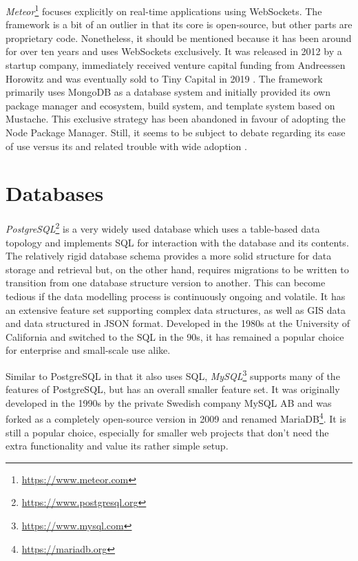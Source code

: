 \emph{Meteor}\footnote{\url{https://www.meteor.com}} focuses explicitly on real-time applications using WebSockets. The framework is a bit of an outlier in that its core is open-source, but other parts are proprietary code. Nonetheless, it should be mentioned because it has been around for over ten years and uses WebSockets exclusively. It was released in 2012 by a startup company, immediately received venture capital funding from Andreessen Horowitz and was eventually sold to Tiny Capital in 2019 \parencite{meteorSaleTinyCapital}. The framework primarily uses MongoDB as a database system and initially provided its own package manager and ecosystem, build system, and template system based on Mustache. This exclusive strategy has been abandoned in favour of adopting the Node Package Manager. Still, it seems to be subject to debate regarding its ease of use versus its  and related trouble with wide adoption \parencite{meteorDiscussionYCombinator}.


\section{Databases}





\emph{PostgreSQL}\footnote{\url{https://www.postgresql.org}} is a very widely used database which uses a table-based data topology and implements \ac{SQL} for interaction with the database and its contents. The relatively rigid database schema provides a more solid structure for data storage and retrieval but, on the other hand, requires migrations to be written to transition from one database structure version to another. This can become tedious if the data modelling process is continuously ongoing and volatile. It has an extensive feature set supporting complex data structures, as well as \ac{GIS} data and data structured in \ac{JSON} format. Developed in the 1980s at the University of California and switched to the \ac{SQL} in the 90s, it has remained a popular choice for enterprise and small-scale use alike.

Similar to PostgreSQL in that it also uses \ac{SQL}, \emph{MySQL}\footnote{\url{https://www.mysql.com}} supports many of the features of PostgreSQL, but has an overall smaller feature set. It was originally developed in the 1990s by the private Swedish company MySQL AB and was forked as a completely open-source version in 2009 and renamed MariaDB\footnote{\url{https://mariadb.org}}. It is still a popular choice, especially for smaller web projects that don't need the extra functionality and value its rather simple setup.

